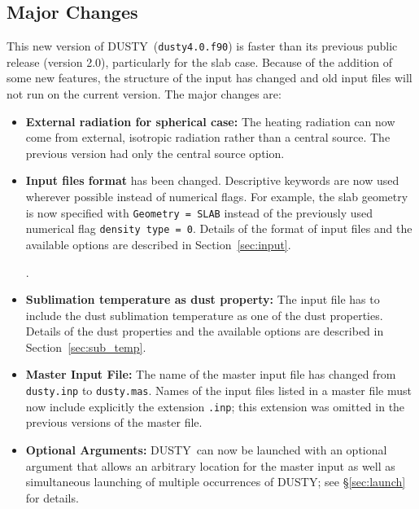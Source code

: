 \documentclass[11pt]{article}
\def\ver  {{\tt dusty4.0}}
\def\D    {{\sf DUSTY}}
\begin{document}
\subsection{Major Changes}
\label{sec:major_changes}

This new version of \D\ ({\tt \ver.f90}) is faster than its previous
public release (version 2.0), particularly for the slab case. Because
of the addition of some new features, the structure of the input has
changed and old input files will not run on the current version. The
major changes are:
%
\begin{itemize}
\item {\bf External radiation for spherical case:} The heating
  radiation can now come from external, isotropic radiation rather
  than a central source. The previous version had only the central
  source option.
\item {\bf Input files format} has been changed. Descriptive keywords
  are now used wherever possible instead of numerical flags. For
  example, the slab geometry is now specified with \hbox{\tt Geometry
    = SLAB} instead of the previously used numerical flag {\tt density
    type = 0}. Details of the format of input files and the available
  options are described in Section~\ref{sec:input}.

  .

\item {\bf Sublimation temperature as dust property:} The input file
  has to include the dust sublimation temperature as one of the dust
  properties.  Details of the dust properties and the available
  options are described in Section~\ref{sec:sub_temp}.

\item {\bf Master Input File:} The name of the master input file has
  changed from {\tt dusty.inp} to {\tt dusty.mas}. Names of the input
  files listed in a master file must now include explicitly the
  extension {\tt .inp}; this extension was omitted in the previous
  versions of the master file.

\item {\bf Optional Arguments:} \D\ can now be launched with an
  optional argument that allows an arbitrary location for the master
  input as well as simultaneous launching of multiple occurrences of
  \D; see \S\ref{sec:launch} for details.

\end{itemize}
\end{document}
